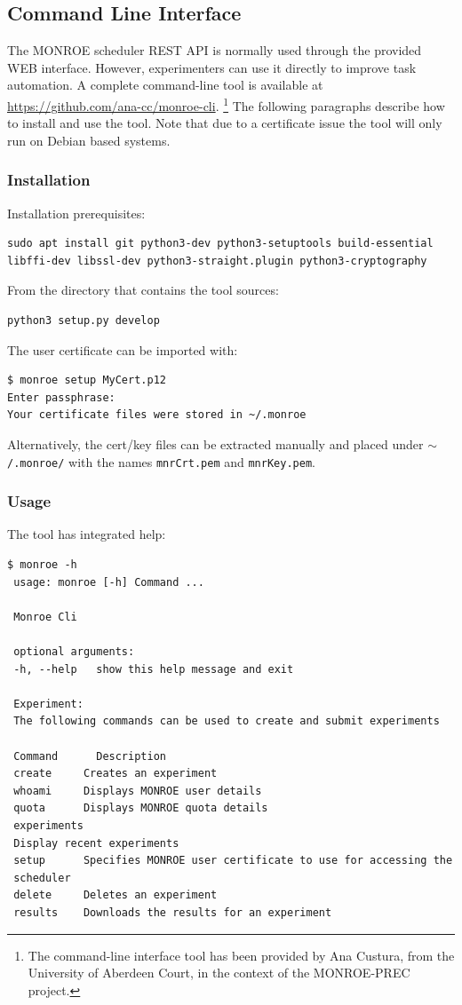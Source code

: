 \documentclass[a4paper,10pt]{article}
\newcommand{\VerbatimFont}{\footnotesize}
\newcommand{\monroe}{MONROE}
\newcommand{\identifier}[1]{{\texttt{\small{#1}}}}
\begin{document}
\FloatBarrier{}
\subsection{Command Line Interface}
\label{subsec:cli}

The \monroe{} scheduler REST API is normally used through the provided WEB interface.
However, experimenters can use it directly to improve task automation.
A complete command-line tool is available at \url{https://github.com/ana-cc/monroe-cli}.%
\footnote{The command-line interface tool has been provided by Ana Custura, from the University of Aberdeen Court, in the context of the MONROE-PREC project.}
The following paragraphs describe how to install and use the tool. Note that due to a certificate issue the tool will only run on Debian based systems.

\subsubsection{Installation}

Installation prerequisites:
{\VerbatimFont\begin{verbatim}
sudo apt install git python3-dev python3-setuptools build-essential libffi-dev libssl-dev python3-straight.plugin python3-cryptography
\end{verbatim}}

\noindent From the directory that contains the tool sources:
{\VerbatimFont\begin{verbatim}
python3 setup.py develop
\end{verbatim}}

\noindent The user certificate can be imported with:
{\VerbatimFont\begin{verbatim}
$ monroe setup MyCert.p12
Enter passphrase:
Your certificate files were stored in ~/.monroe
\end{verbatim}}
Alternatively, the cert/key files can be extracted manually and placed under \identifier{$\sim$/.monroe/}  with the names \identifier{mnrCrt.pem} and \identifier{mnrKey.pem}.

\subsubsection{Usage}

The tool has integrated help:
{\VerbatimFont\begin{verbatim}
$ monroe -h
 usage: monroe [-h] Command ...
 
 Monroe Cli
 
 optional arguments:
 -h, --help   show this help message and exit
 
 Experiment:
 The following commands can be used to create and submit experiments
 
 Command      Description
 create     Creates an experiment
 whoami     Displays MONROE user details
 quota      Displays MONROE quota details
 experiments
 Display recent experiments
 setup      Specifies MONROE user certificate to use for accessing the
 scheduler
 delete     Deletes an experiment
 results    Downloads the results for an experiment
\end{verbatim}}
\end{document}
